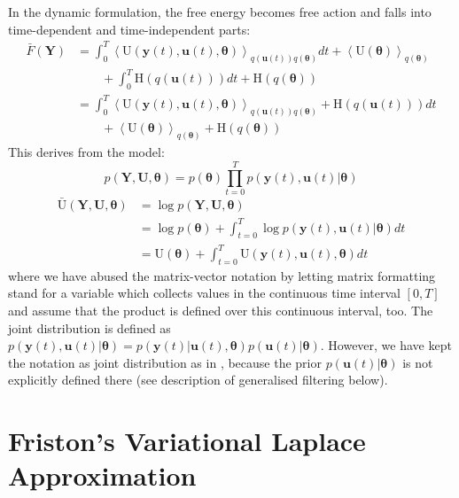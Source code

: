 \documentclass[a4paper,10pt]{article}
\newcommand{\bs}[1]{\mathbf{#1}}					%
\newcommand{\bgs}[1]{\boldsymbol{#1}}				%
\newcommand{\eq}[1]{\begin{equation} #1 \end{equation}}%
\renewcommand{\ss}{u}         %
\newcommand{\so}{y}         %
\renewcommand{\sp}{\theta}    %
\newcommand{\ps}{\bs{\ss}}    %
\newcommand{\po}{\bs{\so}}    %
\newcommand{\pp}{\bgs{\sp}} %
\newcommand{\Ps}{\bs{U}}    %
\newcommand{\Po}{\bs{Y}}    %
\newcommand{\E}[2][]{\left\langle #2 \right\rangle_{#1}}	%
\newcommand{\Ent}{\mathrm{H}}			%
\newcommand{\U}{\mathrm{U}}			%
\newcommand{\Ua}{\bar{\mathrm{U}}}		%
\begin{document}
In the dynamic formulation, the free energy becomes free action and falls into time-dependent and time-independent parts:
\eq{\begin{split}\label{eq:freeAction}
    \bar{F}(\Po) &= \int_0^T \E[q(\ps(t))q(\pp)]{\U(\po(t),\ps(t),\pp)}dt + \E[q(\pp)]{\U(\pp)}\\ 
    & \qquad + \int_0^T\Ent(q(\ps(t)))dt + \Ent(q(\pp))\\
    &= \int_0^T \E[q(\ps(t))q(\pp)]{\U(\po(t),\ps(t),\pp)} + \Ent(q(\ps(t))) dt\\
    & \qquad  + \E[q(\pp)]{\U(\pp)} + \Ent(q(\pp))
\end{split}}
This derives from the model:
\eq{
    p(\Po,\Ps,\pp) = p(\pp)\prod_{t=0}^T p(\po(t),\ps(t)|\pp)
}
\eq{\begin{split}\label{eq:intAction}
    \Ua(\Po,\Ps,\pp) &= \log p(\Po,\Ps,\pp)\\
    &= \log p(\pp) + \int_{t=0}^T \log p(\po(t),\ps(t)|\pp)dt\\
    &= \U(\pp) + \int_{t=0}^T \U(\po(t),\ps(t),\pp)dt
\end{split}}
where we have abused the matrix-vector notation by letting matrix formatting stand for a variable which collects values in the continuous time interval $[0,T]$ and assume that the product is defined over this continuous interval, too. The joint distribution is defined as $p(\po(t),\ps(t)|\pp) = p(\po(t)|\ps(t),\pp)p(\ps(t)|\pp)$. However, we have kept the notation as joint distribution as in \citep{Friston2008a}, because the prior $p(\ps(t)|\pp)$ is not explicitly defined there (see description of generalised filtering below). 

\section{Friston's Variational Laplace Approximation}
\end{document}
